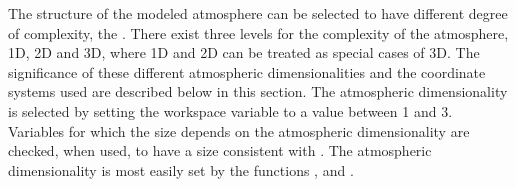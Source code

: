 The structure of the modeled atmosphere can be selected to have
different degree of complexity, the . There exist three levels for the complexity of the
atmosphere, 1D, 2D and 3D, where 1D and 2D can be treated as special
cases of 3D. The significance of these different atmospheric
dimensionalities and the coordinate systems used are described below
in this section. The atmospheric dimensionality is selected by setting
the workspace variable  to a value between 1
and 3. Variables for which the size depends on the atmospheric
dimensionality are checked, when used, to have a size consistent with
. The atmospheric dimensionality is most
easily set by the functions ,
 and .

